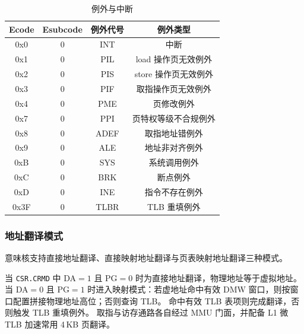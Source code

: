 \begin{table}[H]
\centering
\caption{例外与中断}
\label{tab:excp}
\begin{tabular}{cccc}
\toprule
Ecode & Esubcode & 例外代号 & 例外类型 \\
\midrule
0x0 & 0 & INT & 中断 \\
0x1 & 0 & PIL & load 操作页无效例外 \\
0x2 & 0 & PIS & store 操作页无效例外 \\
0x3 & 0 & PIF & 取指操作页无效例外 \\
0x4 & 0 & PME & 页修改例外 \\
0x7 & 0 & PPI & 页特权等级不合规例外 \\
0x8 & 0 & ADEF & 取指地址错例外 \\
0x9 & 0 & ALE & 地址非对齐例外 \\
0xB & 0 & SYS & 系统调用例外 \\
0xC & 0 & BRK & 断点例外 \\
0xD & 0 & INE & 指令不存在例外 \\
0x3F & 0 & TLBR & TLB 重填例外 \\
\bottomrule
\end{tabular}
\end{table}

\subsubsection{地址翻译模式}

意味核支持直接地址翻译、直接映射地址翻译与页表映射地址翻译三种模式。

当 \texttt{CSR.CRMD} 中 DA$=1$ 且 PG$=0$ 时为直接地址翻译，物理地址等于虚拟地址。
当 DA$=0$ 且 PG$=1$ 时进入映射模式：若虚地址命中有效 DMW 窗口，则按窗口配置拼接物理地址高位；否则查询 TLB。
命中有效 TLB 表项则完成翻译，否则触发 TLB 重填例外。
取指与访存通路各自经过 MMU 门面，并配备 L1 微 TLB 加速常用 4\,KB 页翻译。
